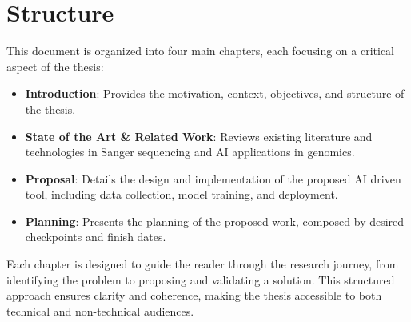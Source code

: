 \section{Structure}
\label{sec:Structure}

This document is organized into four main chapters, each focusing on a critical aspect of the thesis:

\begin{itemize}
\item \textbf{Introduction}: Provides the motivation, context, objectives, and structure of the thesis.
\item \textbf{State of the Art \& Related Work}: Reviews existing literature and technologies in Sanger sequencing and AI applications in genomics.
\item \textbf{Proposal}: Details the design and implementation of the proposed AI driven tool, including data collection, model training, and deployment.
\item \textbf{Planning}: Presents the planning of the proposed work, composed by desired checkpoints and finish dates.
\end{itemize}

Each chapter is designed to guide the reader through the research journey, from identifying the problem to proposing and validating a solution. This structured approach ensures clarity and coherence, making the thesis accessible to both technical and non-technical audiences.

